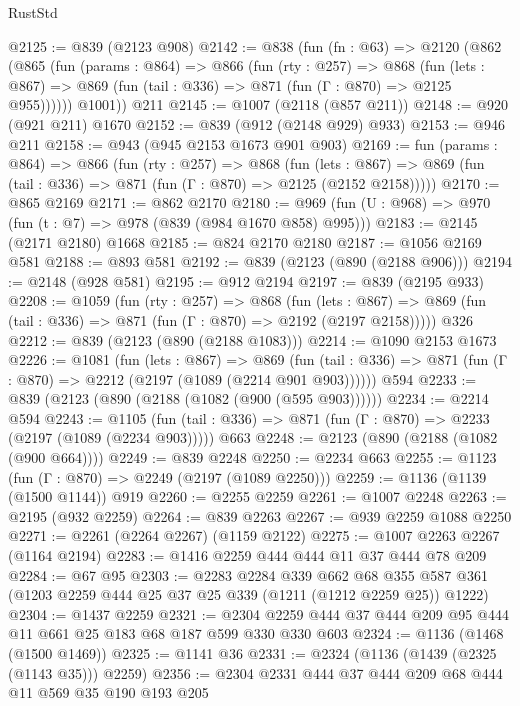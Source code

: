 \begin{lexlean}{RustStd}
\begin{coremodule}
@2125 := @839 (@2123 @908)
@2142 := @838
    (fun (fn : @63) =>
    @2120
      (@862
        (@865
          (fun (params : @864) =>
          @866
            (fun (rty : @257) =>
            @868
              (fun (lets : @867) =>
              @869 (fun (tail : @336) => @871 (fun (Γ : @870) => @2125 @955))))))
        @1001))
    @211
@2145 := @1007 (@2118 (@857 @211))
@2148 := @920 (@921 @211) @1670
@2152 := @839 (@912 (@2148 @929) @933)
@2153 := @946 @211
@2158 := @943 (@945 @2153 @1673 @901 @903)
@2169 := fun (params : @864) =>
  @866
    (fun (rty : @257) =>
    @868
      (fun (lets : @867) =>
      @869 (fun (tail : @336) => @871 (fun (Γ : @870) => @2125 (@2152 @2158)))))
@2170 := @865 @2169
@2171 := @862 @2170
@2180 := @969 (fun (U : @968) => @970 (fun (t : @7) => @978 (@839 (@984 @1670 @858) @995)))
@2183 := @2145 (@2171 @2180) @1668
@2185 := @824 @2170 @2180
@2187 := @1056 @2169 @581
@2188 := @893 @581
@2192 := @839 (@2123 (@890 (@2188 @906)))
@2194 := @2148 (@928 @581)
@2195 := @912 @2194
@2197 := @839 (@2195 @933)
@2208 := @1059
    (fun (rty : @257) =>
    @868
      (fun (lets : @867) =>
      @869 (fun (tail : @336) => @871 (fun (Γ : @870) => @2192 (@2197 @2158)))))
    @326
@2212 := @839 (@2123 (@890 (@2188 @1083)))
@2214 := @1090 @2153 @1673
@2226 := @1081
    (fun (lets : @867) =>
    @869 (fun (tail : @336) => @871 (fun (Γ : @870) => @2212 (@2197 (@1089 (@2214 @901 @903))))))
    @594
@2233 := @839 (@2123 (@890 (@2188 (@1082 (@900 (@595 @903))))))
@2234 := @2214 @594
@2243 := @1105
    (fun (tail : @336) => @871 (fun (Γ : @870) => @2233 (@2197 (@1089 (@2234 @903)))))
    @663
@2248 := @2123 (@890 (@2188 (@1082 (@900 @664))))
@2249 := @839 @2248
@2250 := @2234 @663
@2255 := @1123 (fun (Γ : @870) => @2249 (@2197 (@1089 @2250)))
@2259 := @1136 (@1139 (@1500 @1144)) @919
@2260 := @2255 @2259
@2261 := @1007 @2248
@2263 := @2195 (@932 @2259)
@2264 := @839 @2263
@2267 := @939 @2259 @1088 @2250
@2271 := @2261 (@2264 @2267) (@1159 @2122)
@2275 := @1007 @2263 @2267 (@1164 @2194)
@2283 := @1416 @2259 @444 @444 @11 @37 @444 @78 @209
@2284 := @67 @95
@2303 := @2283
    @2284
    @339
    @662
    @68
    @355
    @587
    @361
    (@1203 @2259 @444 @25 @37 @25 @339 (@1211 (@1212 @2259 @25)) @1222)
@2304 := @1437 @2259
@2321 := @2304 @2259 @444 @37 @444 @209 @95 @444 @11 @661 @25 @183 @68 @187 @599 @330 @330 @603
@2324 := @1136 (@1468 (@1500 @1469))
@2325 := @1141 @36
@2331 := @2324 (@1136 (@1439 (@2325 (@1143 @35))) @2259)
@2356 := @2304
    @2331
    @444
    @37
    @444
    @209
    @68
    @444
    @11
    @569
    @35
    @190
    @193
    @205

\end{coremodule}
\end{lexlean}
